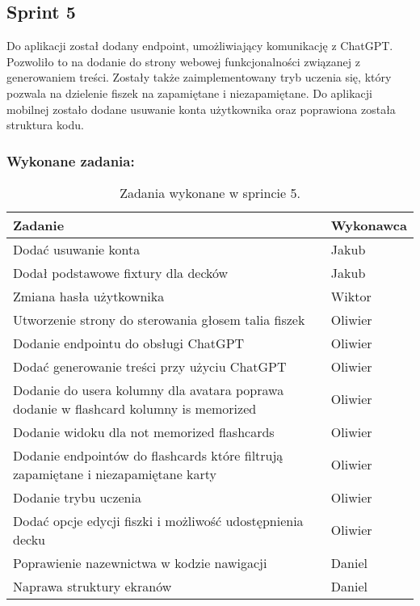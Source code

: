 \subsection{Sprint 5}

Do aplikacji został dodany endpoint, umożliwiający komunikację z ChatGPT. Pozwoliło to na dodanie do strony webowej funkcjonalności związanej z generowaniem treści. Zostały także zaimplementowany tryb uczenia się, który pozwala na dzielenie fiszek na zapamiętane i niezapamiętane. Do aplikacji mobilnej zostało dodane usuwanie konta użytkownika oraz poprawiona została struktura kodu.

\subsubsection{Wykonane zadania:}

\begin{table}[H]
\centering
\begin{tabularx}{\textwidth}{|p{}|X|}
    \hline
    \textbf{Zadanie} & \textbf{Wykonawca} \\
    \hline
    [MOBILE] Dodać usuwanie konta & Jakub \\
    \hline
    [BACKEND] Dodał podstawowe fixtury dla decków & Jakub \\
    \hline
    [WEB] Zmiana hasła użytkownika & Wiktor \\
    \hline
    [WEB] Utworzenie strony do sterowania głosem talia fiszek & Oliwier \\
    \hline
    [BACKEND] Dodanie endpointu do obsługi ChatGPT & Oliwier \\
    \hline
    [WEB] Dodać generowanie treści przy użyciu ChatGPT & Oliwier \\
    \hline
    [BACKEND] Dodanie do usera kolumny dla avatara poprawa dodanie w flashcard kolumny is memorized & Oliwier \\
    \hline
    [WEB] Dodanie widoku dla not memorized flashcards & Oliwier \\
    \hline
    [BACKEND] Dodanie endpointów do flashcards które filtrują zapamiętane i niezapamiętane karty & Oliwier \\
    \hline
    [WEB] Dodanie trybu uczenia & Oliwier \\
    \hline
    [WEB] Dodać opcje edycji fiszki i możliwość udostępnienia decku & Oliwier \\
    \hline
    [MOBILE] Poprawienie nazewnictwa w kodzie nawigacji & Daniel \\
    \hline
    [MOBILE] Naprawa struktury ekranów & Daniel \\
    \hline
\end{tabularx}
                \caption{Zadania wykonane w sprincie 5.}
\end{table}

